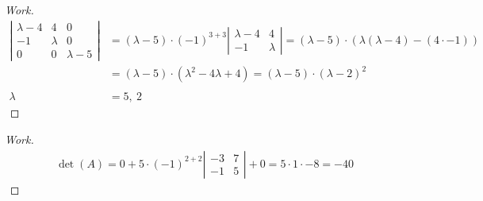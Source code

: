 \documentclass{article}
\begin{document}
\begin{proof}[Work]
    \begin{align*}
        \left\lvert \begin{array}{ccc}
                        \lambda - 4 & 4       & 0         \\
                        -1          & \lambda & 0         \\
                        0           & 0       & \lambda-5
                    \end{array} \right\rvert & = (\lambda-5) \cdot (-1)^{3+3} \left\lvert \begin{array}{cc}
                                                                                              \lambda - 4 & 4       \\
                                                                                              -1          & \lambda
                                                                                          \end{array} \right\rvert = (\lambda-5) \cdot (\lambda(\lambda - 4) - (4 \cdot -1)) \\
                                             & = (\lambda-5) \cdot (\lambda^2 - 4\lambda + 4) = (\lambda-5) \cdot (\lambda-2)^2                                              \\ \\
        \lambda                              & = 5,~2
    \end{align*}
\end{proof}
\qdash

\begin{proof}[Work]
    \begin{align*}
        \det(A) = 0 + 5 \cdot (-1)^{2+2} \left\lvert \begin{array}{cc}
                                                         -3 & 7 \\
                                                         -1 & 5
                                                     \end{array} \right\rvert + 0 = 5 \cdot 1 \cdot -8 = -40
    \end{align*}
\end{proof}
\qdash
\end{document}
